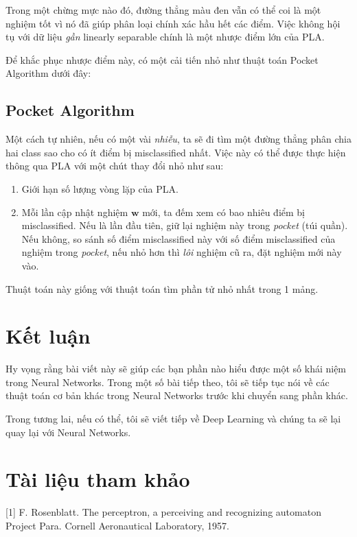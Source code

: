 
Trong một chừng mực nào đó, đường thẳng màu đen vẫn có thể coi là một nghiệm tốt vì nó đã giúp phân loại chính xác hầu hết các điểm. Việc không hội tụ với dữ liệu \textit{gần} linearly separable chính là một nhược điểm lớn của PLA. 
 
Để khắc phục nhược điểm này, có một cải tiến nhỏ như thuật toán Pocket Algorithm dưới đây: 
 
\subsection{Pocket Algorithm}
Một cách tự nhiên, nếu có một vài \textit{nhiễu}, ta sẽ đi tìm một đường thẳng phân chia hai class sao cho có ít điểm bị misclassified nhất. Việc này có thể được thực hiện thông qua PLA với một chút thay đổi nhỏ như sau: 

\begin{enumerate}
    \item Giới hạn số lượng vòng lặp của PLA. 

    \item  Mỗi lần cập nhật nghiệm $\mathbf{w}$ mới, ta đếm xem có bao nhiêu điểm bị misclassified. Nếu là lần đầu tiên, giữ lại nghiệm này trong \textit{pocket} (túi quần). Nếu không, so sánh số điểm misclassified này với số điểm misclassified của nghiệm trong \textit{pocket}, nếu nhỏ hơn thì \textit{lôi} nghiệm cũ ra, đặt nghiệm mới này vào.  
\end{enumerate}
 
Thuật toán này giống với thuật toán tìm phần tử nhỏ nhất trong 1 mảng.  
 
 
\section{Kết luận}
 
Hy vọng rằng bài viết này sẽ giúp các bạn phần nào hiểu được một số khái niệm trong Neural Networks. Trong một số bài tiếp theo, tôi sẽ tiếp tục nói về các thuật toán cơ bản khác trong Neural Networks trước khi chuyển sang phần khác.  
 
Trong tương lai, nếu có thể, tôi sẽ viết tiếp về Deep Learning và chúng ta sẽ lại quay lại với Neural Networks. 
 
 
\section{Tài liệu tham khảo}
 
[1] F. Rosenblatt. The perceptron, a perceiving and recognizing automaton Project Para. Cornell Aeronautical Laboratory, 1957. 
 
